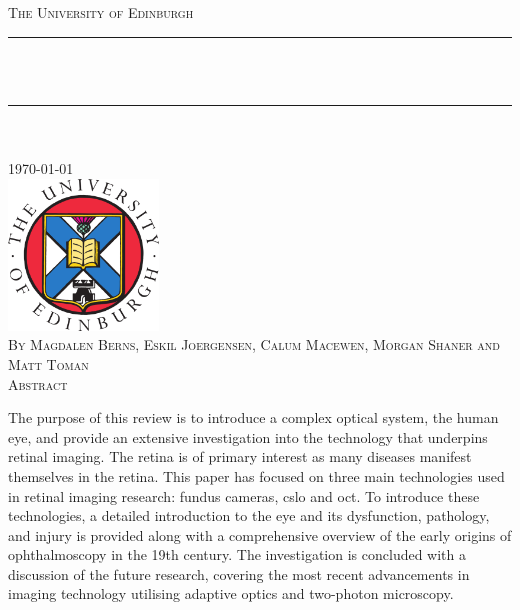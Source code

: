 \documentclass[11pt, a4paper, oneside]{Thesis}
\title{\ttitle}
\begin{document}
\frontmatter %
\fancyhead{} %
\rhead{\thepage} %
\lhead{} %
\pagestyle{fancy}
\newcommand{\HRule}{\rule{\linewidth}{0.5mm}} %




\begin{titlepage}
\begin{center}

\textsc{\LARGE The University of Edinburgh}\\[1.5cm]
\HRule \\[0.8cm] %

\textsc{\huge \ttitle }\\[0.2cm]
\HRule \\[0.5cm] %
\textsc{\Large \deptname}\\[1.0cm]

\large \today \\[1cm]

\includegraphics[width=4.0cm]{logo}\\[1cm]

\textsc{\small By Magdalen Berns, Eskil Joergensen, Calum Macewen, Morgan Shaner and Matt Toman} \\[1cm]

\textsc{\Large{Abstract}}\\
\end{center}

The purpose of this review is to introduce a complex optical system, 
the human eye, and provide an extensive investigation into the technology 
that underpins retinal imaging.  The retina is of primary interest as many 
diseases manifest themselves in the retina. This paper has focused on 
three main technologies used in retinal imaging research: fundus cameras, 
\Gls{cslo} and \Gls{oct}. To introduce these technologies, a detailed 
introduction to the eye and its dysfunction, pathology, and injury is provided 
along with a comprehensive overview of the early origins of ophthalmoscopy 
in the 19th century. The investigation is concluded with a discussion of the 
future research, covering the most recent advancements in imaging 
technology utilising adaptive optics and two-photon microscopy.

\end{titlepage}
\end{document}
